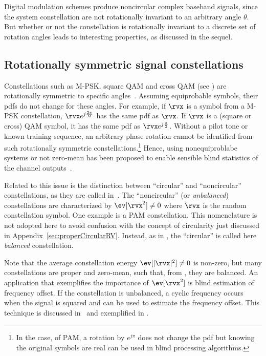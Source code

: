 Digital modulation schemes produce noncircular complex baseband signals,
since the system constellation are not rotationally invariant to an arbitrary angle $\theta$.
But whether or not the constellation is rotationally invariant to a discrete set of rotation
angles leads to interesting properties, as discussed in the sequel.

\subsection{Rotationally symmetric signal constellations}
\label{sec:balancedConstellation}

Constellations such as M-PSK, square QAM and cross QAM (see ) are 
rotationally symmetric to specific angles~\cite{Moeneclaey94}. Assuming equiprobable symbols,
their pdfs do not change for these angles. For example, if $\rvx$ is a symbol from a M-PSK constellation, $\rvx e^{j \frac{2\pi}{M}}$ has the same pdf as $\rvx$. If $\rvx$ is a (square or cross) QAM symbol, it has the same pdf as $\rvx e^{j \frac{\pi}{2}}$. Without a pilot tone or known training sequence, an arbitrary phase rotation cannot be identified from such rotationally symmetric constellations.\footnote{In the case, of PAM, a rotation by $e^{j \pi}$ does not change the pdf but knowing the original symbols are real can be used in blind processing algorithms.} Hence, using nonequiproblabe systems or not zero-mean has been proposed to enable sensible blind statistics of the channel outputs~\cite{Thaiupathump00}.

Related to this issue is the distinction between ``circular'' and ``noncircular'' constellations, as they are called in~\cite{Ciblat02,Ciblat03}. The ``noncircular'' (or \emph{unbalanced}) constellations
are characterized by $\ev[\rvx^2] \ne 0$ where $\rvx$ is the random constellation symbol. One
example is a PAM constellation.
This nomenclature is not adopted here to avoid confusion with the concept of circularity
just discussed in Appendix~\ref{sec:properCircularRV}. Instead, as in \cite{Franks80}, the ``circular'' is called here \emph{balanced} constellation.

Note that the average constellation energy $\ev[|\rvx|^2] \ne 0$ is non-zero, but
many constellations are proper and zero-mean, such that, from , they are balanced.
An application that exemplifies the importance of $\ev[\rvx^2]$ is blind estimation
of frequency offset. If the constellation is unbalanced, a cyclic frequency occurs
when the signal is squared and can be  used to estimate the frequency offset. This technique is discussed in~\cite{Ciblat02,Ciblat03} and exemplified in .
\fi %

